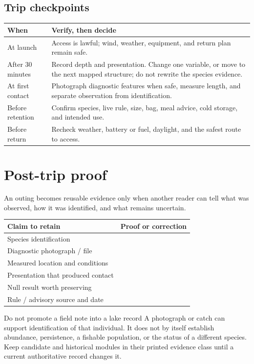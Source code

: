 \subsection*{Trip checkpoints}
\begin{tabularx}{\linewidth}{@{}p{.18\linewidth}L@{}}
\toprule
When & Verify, then decide\\
\midrule
At launch & Access is lawful; wind, weather, equipment, and return plan remain
safe.\\
After 30 minutes & Record depth and presentation. Change one variable, or move
to the next mapped structure; do not rewrite the species evidence.\\
At first contact & Photograph diagnostic features when safe, measure length,
and separate observation from identification.\\
Before retention & Confirm species, live rule, size, bag, meal advice, cold
storage, and intended use.\\
Before return & Recheck weather, battery or fuel, daylight, and the safest
route to access.\\
\bottomrule
\end{tabularx}

\clearpage
\section*{Post-trip proof}
An outing becomes reusable evidence only when another reader can tell what was
observed, how it was identified, and what remains uncertain.

\begin{tabularx}{\linewidth}{@{}p{.29\linewidth}L@{}}
\toprule
Claim to retain & Proof or correction\\
\midrule
Species identification & \rule{0pt}{3em}\dotfill\\
Diagnostic photograph / file & \rule{0pt}{3em}\dotfill\\
Measured location and conditions & \rule{0pt}{3em}\dotfill\\
Presentation that produced contact & \rule{0pt}{3em}\dotfill\\
Null result worth preserving & \rule{0pt}{3em}\dotfill\\
Rule / advisory source and date & \rule{0pt}{3em}\dotfill\\
\bottomrule
\end{tabularx}

\begin{teloshazard}{Do not promote a field note into a lake record}
A photograph or catch can support identification of that individual. It does
not by itself establish abundance, persistence, a fishable population, or the
status of a different species. Keep candidate and historical modules in their
printed evidence class until a current authoritative record changes it.
\end{teloshazard}

